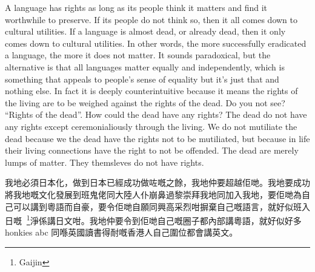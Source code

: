 A language has rights as long as its people think it matters and find it worthwhile to preserve. If its people do not think so, then it all comes down to cultural utilities. If a language is almost dead, or already dead, then it only comes down to cultural utilities. In other words, the more successfully eradicated a language, the more it does not matter. It sounds paradoxical, but the alternative is that all languages matter equally and independently, which is something that appeals to people’s sense of equality but it’s just that and nothing else. In fact it is deeply counterintuitive because it means the rights of the living are to be weighed against the rights of the dead. Do you not see? “Rights of the dead”. How could the dead have any rights? The dead do not have any rights except ceremonialiously through the living. We do not mutiliate the dead because we the dead have the rights not to be mutiliated, but because in life their living connections have the right to not be offended. The dead are merely lumps of matter. They themsleves do not have rights.

\separator

我地必須日本化，做到日本已經成功做咗嘅之餘，我地仲要超越佢哋。我地要成功將我地嘅文化發展到班鬼佬同大陸人仆崩鼻過黎崇拜我地同加入我地，要佢哋為自己可以講到粵語而自豪，要令佢哋自願同興高采烈咁摒棄自己嘅語言，就好似班入日嘅󱛞\footnote{Gaijin}淨係講日文咁。我地仲要令到佢哋自己嘅圈子都內部講粵語，就好似好多honkies abc 同喺英國讀書得耐嘅香港人自己圍位都會講英文。

